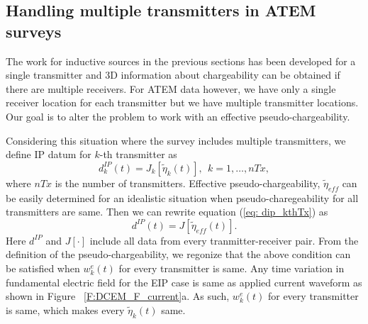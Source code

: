 \documentclass[a4paper, 11pt]{article}
\newcommand{\peta}{\tilde{\eta}}
\newcommand{\dip}{d^{IP}}
\begin{document}
\subsection{Handling multiple transmitters in ATEM surveys}
\label{subsection: Handling multiple transmitters in ATEM surveys}
The work for inductive sources in the previous sections has been developed for a single transmitter and  3D information about chargeability can be obtained if there are multiple receivers. For ATEM data however, we have only a single receiver location for each transmitter but we have multiple transmitter locations. 
Our goal is to alter the problem to work with an effective pseudo-chargeability. 


Considering this situation where the survey includes multiple transmitters, we define IP datum for $k$-th transmitter as 
\begin{equation}
  \dip_k(t) = J_k[\peta_k (t)], \ \ k=1, \ldots, nTx,
  \label{eq: dip_kthTx}
\end{equation}
where $nTx$ is the number of transmitters. Effective pseudo-chargeability, $\peta_{eff}$ can be easily determined for an idealistic situation when pseudo-charegeability for all transmitters are same. Then we can rewrite equation (\ref{eq: dip_kthTx}) as 
\begin{equation}
  \dip(t) = J[\peta_{eff}(t)].
  \label{eq: dip_eff}
\end{equation}
Here $\dip$ and $J[\cdot]$ include all data from every tranmitter-receiver pair. From the definition of the pseudo-chargeability, we regonize that the above condition can be satisfied when $w^e_k(t)$ for every transmitter is same. 
Any time variation in fundamental electric field for the EIP case is same as applied current waveform as shown in Figure ~\ref{F:DCEM_F_current}a. 
As such, $w^e_k(t)$ for every transmitter is same, which makes every $\peta_k(t)$ same. 
\end{document}
